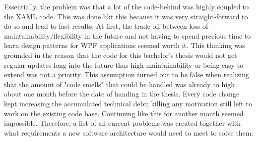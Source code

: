 Essentially, the problem was that a lot of the code-behind was highly coupled to the XAML code. This was done likt this because it was very straight-forward to do so and lead to fast results. At first, the trade-off between loss of maintainability/flexibility in the future and not having to spend precious time to learn design patterns for WPF applications seemed worth it. This thinking was grounded in the reason that the code for this bachelor's thesis would not get regular updates long into the future thus high maintainability or being easy to extend was not a priority. This assumption turned out to be false when realizing that the amount of "code smells" that could be handled was already to high about one month before the date of handing in the thesis. Every code change kept increasing the accumulated technical debt; killing any motivation still left to work on the existing code base. Continuing like this for another month seemed impossible. Therefore, a list of all current problems was created together with what requirements a new software architecture would need to meet to solve them:

